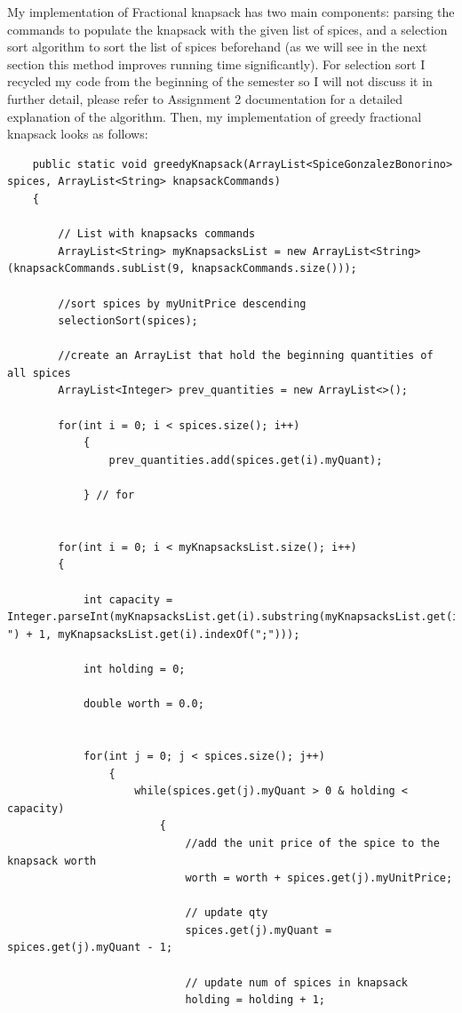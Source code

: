 \documentclass[letterpaper, 10pt]{article}
\begin{document}
My implementation of Fractional knapsack has two main components: parsing the commands to populate the knapsack with the given list of spices, and a selection sort algorithm to sort the list of spices beforehand (as we will see in the next section this method improves running time significantly). For selection sort I recycled my code from the beginning of the semester so I will not discuss it in further detail, please refer to Assignment 2 documentation for a detailed explanation of the algorithm. Then, my implementation of greedy fractional knapsack looks as follows:
\begin{lstlisting}
    public static void greedyKnapsack(ArrayList<SpiceGonzalezBonorino> spices, ArrayList<String> knapsackCommands)
    {
    	
        // List with knapsacks commands
        ArrayList<String> myKnapsacksList = new ArrayList<String>(knapsackCommands.subList(9, knapsackCommands.size()));

        //sort spices by myUnitPrice descending
        selectionSort(spices);

        //create an ArrayList that hold the beginning quantities of all spices
        ArrayList<Integer> prev_quantities = new ArrayList<>();
        
        for(int i = 0; i < spices.size(); i++)
	        {
	            prev_quantities.add(spices.get(i).myQuant);
	            
	        } // for


        for(int i = 0; i < myKnapsacksList.size(); i++)
        {

            int capacity = Integer.parseInt(myKnapsacksList.get(i).substring(myKnapsacksList.get(i).lastIndexOf(" ") + 1, myKnapsacksList.get(i).indexOf(";")));

            int holding = 0;

            double worth = 0.0;


            for(int j = 0; j < spices.size(); j++)
	            {
	                while(spices.get(j).myQuant > 0 & holding < capacity)
		                {
		                    //add the unit price of the spice to the knapsack worth
		                    worth = worth + spices.get(j).myUnitPrice;
		                    
		                    // update qty
		                    spices.get(j).myQuant = spices.get(j).myQuant - 1;
		                    
		                    // update num of spices in knapsack
		                    holding = holding + 1;
		                    

\end{lstlisting}
\end{document}

